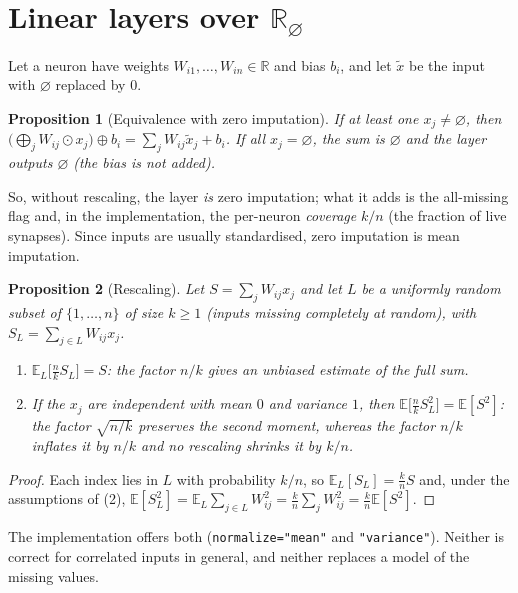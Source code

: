 \documentclass[11pt,a4paper]{article}
\newtheorem{proposition}{Proposition}
\theoremstyle{definition}
\theoremstyle{remark}
\newcommand{\R}{\mathbb{R}}
\newcommand{\Rn}{\R_{\varnothing}}
\newcommand{\nul}{\varnothing}
\newcommand{\op}{\oplus}
\newcommand{\od}{\odot}
\begin{document}
\section{Linear layers over \texorpdfstring{$\Rn$}{R-null}}

Let a neuron have weights $W_{i1},\dots,W_{in}\in\R$ and bias $b_i$, and let
$\tilde x$ be the input with $\nul$ replaced by $0$.

\begin{proposition}[Equivalence with zero imputation]\label{prop:impute}
If at least one $x_j\neq\nul$, then
$\bigl(\bigoplus_j W_{ij}\od x_j\bigr)\op b_i=\sum_j W_{ij}\tilde x_j+b_i$.
If all $x_j=\nul$, the sum is $\nul$ and the layer outputs $\nul$ (the bias is
not added).
\end{proposition}

So, without rescaling, the layer \emph{is} zero imputation; what it adds is
the all-missing flag and, in the implementation, the per-neuron
\emph{coverage} $k/n$ (the fraction of live synapses). Since inputs are
usually standardised, zero imputation is mean imputation.

\begin{proposition}[Rescaling]\label{prop:scale}
Let $S=\sum_j W_{ij}x_j$ and let $L$ be a uniformly random subset of
$\{1,\dots,n\}$ of size $k\geq 1$ (inputs missing completely at random), with
$S_L=\sum_{j\in L}W_{ij}x_j$.
\begin{enumerate}
\item $\mathbb{E}_L\bigl[\tfrac{n}{k}S_L\bigr]=S$: the factor $n/k$ gives an
      unbiased estimate of the full sum.
\item If the $x_j$ are independent with mean $0$ and variance $1$, then
      $\mathbb{E}\bigl[\tfrac{n}{k}S_L^2\bigr]=\mathbb{E}[S^2]$: the factor
      $\sqrt{n/k}$ preserves the second moment, whereas the factor $n/k$
      inflates it by $n/k$ and no rescaling shrinks it by $k/n$.
\end{enumerate}
\end{proposition}
\begin{proof}
Each index lies in $L$ with probability $k/n$, so
$\mathbb{E}_L[S_L]=\tfrac{k}{n}S$ and, under the assumptions of (2),
$\mathbb{E}[S_L^2]=\mathbb{E}_L\sum_{j\in L}W_{ij}^2=\tfrac{k}{n}\sum_jW_{ij}^2
=\tfrac{k}{n}\mathbb{E}[S^2]$.
\end{proof}

The implementation offers both (\texttt{normalize="mean"} and
\texttt{"variance"}). Neither is correct for correlated inputs in general, and
neither replaces a model of the missing values.
\end{document}
